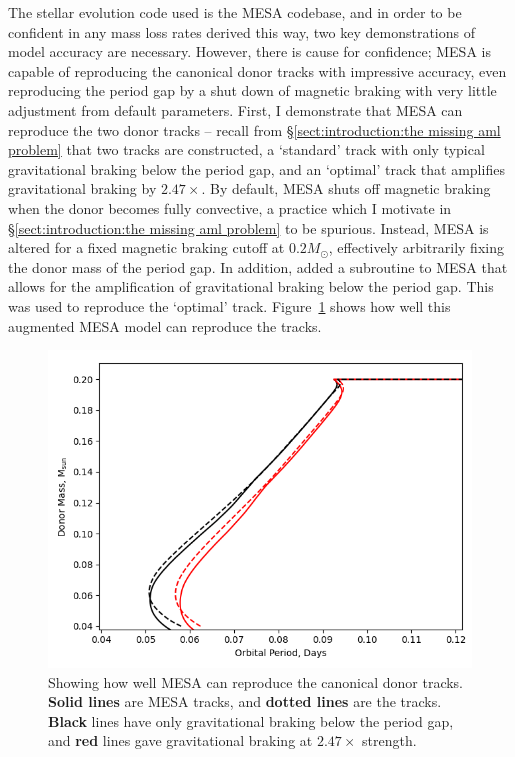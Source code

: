 The stellar evolution code used is the MESA codebase, and in order to be confident in any mass loss rates derived this way, two key demonstrations of model accuracy are necessary. However, there is cause for confidence; MESA is capable of reproducing the canonical \citep{knigge11} donor tracks with impressive accuracy, even reproducing the period gap by a shut down of magnetic braking \citep{Paxton_2015} with very little adjustment from default parameters.
First, I demonstrate that MESA can reproduce the two \citet{knigge11} donor tracks -- recall from \S\ref{sect:introduction:the missing aml problem} that two tracks are constructed, a `standard' track with only typical gravitational braking below the period gap, and an `optimal' track that amplifies gravitational braking by $2.47\times$.
By default, MESA shuts off magnetic braking when the donor becomes fully convective, a practice which I motivate in \S\ref{sect:introduction:the missing aml problem} to be spurious. Instead, MESA is altered for a fixed magnetic braking cutoff at $0.2 M_\odot$, effectively arbitrarily fixing the donor mass of the period gap.
In addition, \citet{Pala2017a} added a subroutine to MESA that allows for the amplification of gravitational braking below the period gap. This was used to reproduce the `optimal' track. Figure~\ref{fig:modelling:MESA can reproduce the K11 tracks} shows how well this augmented MESA model can reproduce the \citet{knigge11} tracks.
\begin{figure}
    \centering
    \includegraphics[width=.9\textwidth]{figures/modelling/compare_K11_withspot_normb_and_1xrmb_fixedcutoff.png}
    \caption{Showing how well MESA can reproduce the canonical \citet{knigge11} donor tracks. {\bf Solid lines} are MESA tracks, and {\bf dotted lines} are the \citet{knigge11} tracks. {\bf Black} lines have only gravitational braking below the period gap, and {\bf red} lines gave gravitational braking at $2.47\times$ strength.}
    \label{fig:modelling:MESA can reproduce the K11 tracks}
\end{figure}

